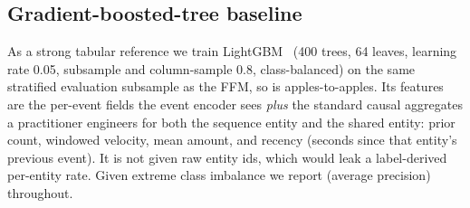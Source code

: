 \subsection{Gradient-boosted-tree baseline}
\label{sec:method:gbdt}
As a strong tabular reference we train LightGBM~\cite{ke2017lightgbm} (\num{400} trees, \num{64}
leaves, learning rate \num{0.05}, subsample and column-sample \num{0.8}, class-balanced) on the same
stratified evaluation subsample as the FFM, so \prauc{} is apples-to-apples. Its features are the
per-event fields the event encoder sees \emph{plus} the standard causal aggregates a practitioner
engineers for both the sequence entity and the shared entity: prior count, windowed velocity, mean
amount, and recency (seconds since that entity's previous event). It is not given raw entity ids,
which would leak a label-derived per-entity rate. Given extreme class imbalance we report \prauc{}
(average precision) throughout.
